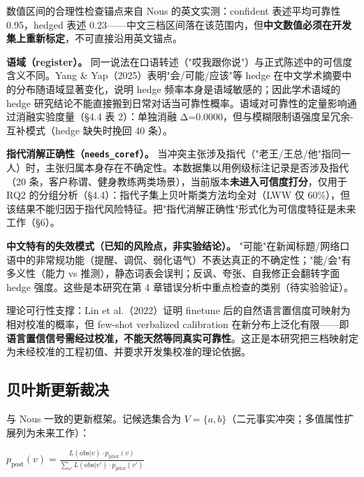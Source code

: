 \documentclass{article}
\begin{document}
数值区间的合理性检查锚点来自 Nous 的英文实测：confident 表述平均可靠性 0.95，hedged 表述 0.23——中文三档区间落在该范围内，但\textbf{中文数值必须在开发集上重新标定}，不可直接沿用英文锚点。


\textbf{语域（register）。} 同一说法在口语转述（"哎我跟你说"）与正式陈述中的可信度含义不同。Yang \& Yap（2025）表明"会/可能/应该"等 hedge 在中文学术摘要中的分布随语域显著变化，说明 hedge 频率本身是语域敏感的；因此学术语域的 hedge 研究结论不能直接搬到日常对话当可靠性概率。语域对可靠性的定量影响通过消融实验度量（§4.4 表 2）：单独消融 Δ=0.0000，但与模糊限制语强度呈冗余-互补模式（hedge 缺失时挽回 40 条）。


\textbf{指代消解正确性（\texttt{needs\_coref}）。} 当冲突主张涉及指代（"老王/王总/他"指同一人）时，主张归属本身存在不确定性。本数据集以用例级标注记录是否涉及指代（20 条，客户称谓、健身教练两类场景），当前版本\textbf{未进入可信度打分}，仅用于 RQ2 的分组分析（§4.4）：指代子集上贝叶斯类方法均全对（LWW 仅 60\%），但该结果不能归因于指代风险特征。把"指代消解正确性"形式化为可信度特征是未来工作（§6）。


\textbf{中文特有的失效模式（已知的风险点，非实验结论）。} "可能"在新闻标题/网络口语中的非常规功能（提醒、调侃、弱化语气）不表达真正的不确定性；"能/会"有多义性（能力 vs 推测），静态词表会误判；反讽、夸张、自我修正会翻转字面 hedge 强度。这些是本研究在第 4 章错误分析中重点检查的类别（待实验验证）。


理论可行性支撑：Lin et al.（2022）证明 finetune 后的自然语言置信度可映射为相对校准的概率，但 few-shot verbalized calibration 在新分布上泛化有限——即\textbf{语言置信信号需经过校准，不能天然等同真实可靠性}。这正是本研究把三档映射定为未经校准的工程初值、并要求开发集校准的理论依据。


\subsection{贝叶斯更新裁决}

与 Nous 一致的更新框架。记候选集合为 $V=\{a,b\}$（二元事实冲突；多值属性扩展列为未来工作）：


$p_{\mathrm{post}}(v) = \frac{L(\mathrm{obs}|v)\cdot p_{\mathrm{prior}}(v)}{\sum_{v'} L(\mathrm{obs}|v')\cdot p_{\mathrm{prior}}(v')}$
\end{document}
